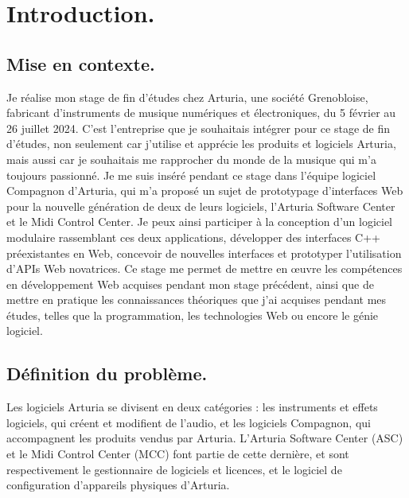 \documentclass[francais]{rapportPFE}  %
\begin{document}



     
     
     
\section{Introduction.}

\subsection{Mise en contexte.}
Je réalise mon stage de fin d'études chez Arturia, une société Grenobloise, fabricant d'instruments de musique numériques et électroniques, du 5 février au 26 juillet 2024. C'est l'entreprise que je souhaitais intégrer pour ce stage de fin d'études, non seulement car j'utilise et apprécie les produits et logiciels Arturia, mais aussi car je souhaitais me rapprocher du monde de la musique qui m'a toujours passionné. 
Je me suis inséré pendant ce stage dans l'équipe logiciel Compagnon d'Arturia, qui m'a proposé un sujet de prototypage d'interfaces Web pour la nouvelle génération de deux de leurs logiciels, l'Arturia Software Center et le Midi Control Center. Je peux ainsi participer à la conception d'un logiciel modulaire rassemblant ces deux applications, développer des interfaces C++ préexistantes en Web, concevoir de nouvelles interfaces et prototyper l'utilisation d'APIs Web novatrices. Ce stage me permet de mettre en œuvre les compétences en développement Web acquises pendant mon stage précédent, ainsi que de mettre en pratique les connaissances théoriques que j'ai acquises pendant mes études, telles que la programmation, les technologies Web ou encore le génie logiciel.
\subsection{Définition du problème.}

Les logiciels Arturia se divisent en deux catégories : les instruments et effets logiciels, qui créent et modifient de l'audio, et les logiciels Compagnon, qui accompagnent les produits vendus par Arturia.
L'Arturia Software Center (ASC) et le Midi Control Center (MCC) font partie de cette dernière, et sont respectivement le gestionnaire de logiciels et licences, et le logiciel de configuration d'appareils physiques d'Arturia.
\end{document}
